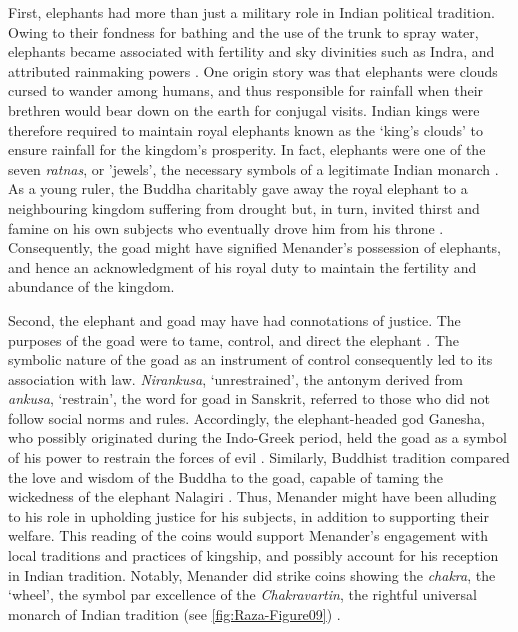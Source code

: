 \documentclass{ijsra}
\begin{document}
First, elephants had more than just a military role in Indian political tradition.
Owing to their fondness for bathing and the use of the trunk to spray water, elephants became associated with fertility and sky divinities such as Indra, and attributed rainmaking powers \parencite[19]{Gupta1983}.
One origin story was that elephants were clouds cursed to wander among humans, and thus responsible for rainfall when their brethren would bear down on the earth for conjugal visits.
Indian kings were therefore required to maintain royal elephants known as the ‘king’s clouds’ to ensure rainfall for the kingdom’s prosperity.
In fact, elephants were one of the seven \emph{ratnas}, or 'jewels', the necessary symbols of a legitimate Indian monarch \parencites[38--39]{Gonda1966}[107]{Campbell2015}.
As a young ruler, the Buddha charitably gave away the royal elephant to a neighbouring kingdom suffering from drought but, in turn, invited thirst and famine on his own subjects who eventually drove him from his throne \parencite[23--24]{Gupta1983}.
Consequently, the goad might have signified Menander’s possession of elephants, and hence an acknowledgment of his royal duty to maintain the fertility and abundance of the kingdom.

Second, the elephant and goad may have had connotations of justice.
The purposes of the goad were to tame, control, and direct the elephant \parencite[66--67]{Trautmann2015}.
The symbolic nature of the goad as an instrument of control consequently led to its association with law. \emph{Nirankusa}, ‘unrestrained’, the antonym derived from \emph{ankusa}, ‘restrain’, the word for goad in Sanskrit, referred to those who did not follow social norms and rules.
Accordingly, the elephant-headed god Ganesha, who possibly originated during the Indo-Greek period, held the goad as a symbol of his power to restrain the forces of evil \parencites[96]{Alter2004}[144]{Dhavalikar1981}.
Similarly, Buddhist tradition compared the love and wisdom of the Buddha to the goad, capable of taming the wickedness of the elephant Nalagiri \parencite[96]{Dhammika2005}.
Thus, Menander might have been alluding to his role in upholding justice for his subjects, in addition to supporting their welfare.
This reading of the coins would support Menander’s engagement with local traditions and practices of kingship, and possibly account for his reception in Indian tradition.
Notably, Menander did strike coins showing the \emph{chakra}, the ‘wheel’, the symbol par excellence of the \emph{Chakravartin}, the rightful universal monarch of Indian tradition (see \cref{fig:Raza-Figure09}) \parencite[15]{Stanco2012}.
\end{document}
